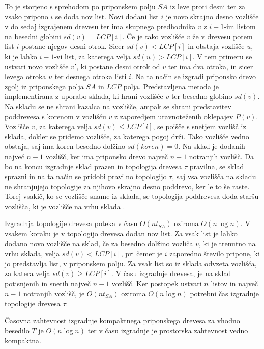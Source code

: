 To je storjeno s sprehodom po priponskem polju $SA$ iz leve proti desni ter za vsako pripono $i$ se doda nov list. Novi dodani list $i$ je novo skrajno desno vozlišče v do sedaj izgrajenem drevesu ter ima skupnega predhodnika $v$ z $i-1$-im listom na besedni globini $sd(v)=LCP[i]$. Če je tako vozlišče $v$ že v drevesu potem list $i$ postane njegov desni otrok. Sicer $sd(v)<LCP[i]$ in obstaja vozlišče $u$, ki je lahko $i-1$-vi list, za katerega velja  $sd(u)>LCP[i]$. V tem primeru se ustvari novo vozlišče $v'$, ki postane desni otrok od $v$ ter ima dva otroka, in sicer levega otroka $u$ ter desnega otroka listi $i$. Na ta način se izgradi priponsko drevo zgolj iz priponskega polja $SA$ in $LCP$ polja. Predstavljena metoda je implementirana z uporabo sklada, ki hrani vozlišče $v$ ter besedno globino $sd(v)$. Na skladu se ne shrani kazalca na vozlišče, ampak se shrani predstavitev poddrevesa s korenom v vozlišču $v$ z zaporedjem uravnoteženih oklepajev $P(v)$. Vozlišče $v$, za katerega velja $sd(v)\le LCP[i]$, se poišče s snetjem vozlišč iz sklada, dokler se pridemo vozlišče, za katerega pogoj drži. Tako vozlišče vedno obstaja, saj ima koren besedno dolžino $sd(koren)=0$. Na sklad je dodanih največ $n-1$ vozlišč, ker ima priponsko drevo največ $n-1$ notranjih vozlišč. Da bo na koncu izgradnje sklad prazen in topologija drevesa $\tau$ pravilna, se sklad sprazni in na ta način se pridobi pravilno topologijo $\tau$, saj vsa vozlišča na skladu ne shranjujejo topologije za njihovo skrajno desno poddrevo, ker le to še raste. Torej vsakič, ko se vozlišče sname iz sklada, se topologija poddrevesa doda staršu vozlišča, ki je vozlišče na vrhu sklada \cite{Navarro2016}.

Izgradnja topologije drevesa poteka v času $O(nt_{SA})$ oziroma $O(n\log{n})$. V vsakem koraku je v topologijo drevesa dodan nov list. Za vsak list je lahko dodano novo vozlišče na sklad, če za besedno dolžino vozliča $v$, ki je trenutno na vrhu sklada, velja $sd(v)<LCP[i]$, pri čemer je  $i$ zaporedno število pripone, ki jo predstavlja list, v priponskem polju. Za vsak list so iz sklada odvzeta vozlišča, za katera velja $sd(v)\ge LCP[i]$. V času izgradnje drevesa, je na sklad potisnjenih in snetih največ $n-1$ vozlišč. Ker postopek ustvari $n$ listov in največ $n-1$ notranjih vozlišč, je $O(nt_{SA})$ oziroma $O(n\log{n})$ potrebni čas izgradnje topologije drevesa $\tau$.

\begin{izr} \label{izr:izgradnjaCST}
    Časovna zahtevnost izgradnje kompaktnega priponskega drevesa za vhodno besedilo $T$ je $O(n\log{n})$ ter v času izgradnje je prostorska zahtevnost vedno kompaktna.
\end{izr}

